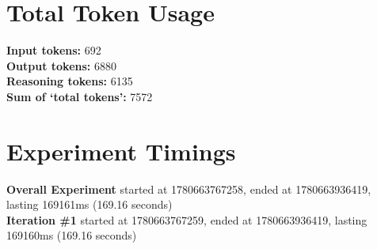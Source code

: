 \documentclass{article}
\begin{document}
\section*{Total Token Usage}
\textbf{Input tokens: }692
\\\textbf{Output tokens: }6880
\\\textbf{Reasoning tokens: }6135
\\\textbf{Sum of `total tokens': }7572
\section*{Experiment Timings}
\textbf{Overall Experiment} started at 1780663767258, ended at 1780663936419, lasting 169161ms (169.16 seconds)
\\\textbf{Iteration \#1} started at 1780663767259, ended at 1780663936419, lasting 169160ms (169.16 seconds)
\end{document}
